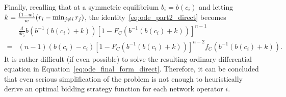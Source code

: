 Finally, recalling that at a symmetric equilibrium $b_i=b(c_i)$ and letting $k=\nobreak\frac{(1-w)}{w}(r_i-\min_{j\neq i}r_j)$, the identity~\eqref{eq:ode_part2_direct} becomes
\begin{align}
	\label{eq:ode_final_form_direct}
	&\frac{d}{dc_i}b\left( b^{-1}(b(c_i) + k) \right) \left[ 1 - F_C(b^{-1}(b(c_i)+k)) \right]^{n-1} \nonumber\\
	= &(n-1)(b(c_i)-c_i)\left[ 1 - F_C(b^{-1}(b(c_i)+k)) \right]^{n-2} f_C(b^{-1}(b(c_i)+k)).
\end{align}
It is rather difficult (if even possible) to solve the resulting ordinary differential equation in Equation~\eqref{eq:ode_final_form_direct}. Therefore, it can be concluded that even serious simplification of the problem is not enough to heuristically derive an optimal bidding strategy function for each network operator $i$.

